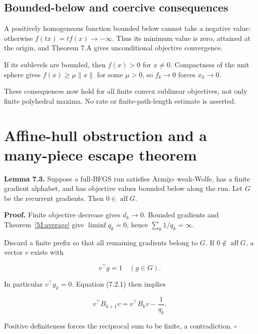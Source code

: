 

\subsection{Bounded-below and coercive
consequences}\label{H:bounded-below-and-coercive-consequences}


A positively homogeneous function bounded below cannot take a negative
value: otherwise \(f(tx)=tf(x)\to-\infty\). Thus its minimum value is
zero, attained at the origin, and Theorem 7.A gives unconditional
objective convergence.

If its sublevels are bounded, then \(f(x)>0\) for \(x\ne0\). Compactness
of the unit sphere gives \(f(x)\ge\mu\|x\|\) for some \(\mu>0\), so
\(f_k\to0\) forces \(x_k\to0\).

These consequences now hold for all finite convex sublinear objectives,
not only finite polyhedral maxima. No rate or finite-path-length
estimate is asserted.


\setcounter{section}{5}
\setcounter{theorem}{0}
\setcounter{lemma}{0}
\setcounter{corollary}{0}
\setcounter{proposition}{0}
\setcounter{remark}{0}
\setcounter{equation}{0}


\section{Affine-hull obstruction and a many-piece escape
theorem}\label{H:affine-hull-obstruction-and-a-many-piece-escape-theorem}

\textbf{Lemma 7.3.} Suppose a full-BFGS run satisfies Armijo--weak-Wolfe,
has a finite gradient alphabet, and has objective values bounded below
along the run. Let \(G\) be the recurrent gradients. Then
\(0\in\operatorname{aff}G\).

\textbf{Proof.} Finite objective decrease gives \(d_k\to0\). Bounded
gradients and Theorem~\ref{M:average} give \(\liminf q_k=0\), hence
\(\sum_k1/q_k=\infty\).

Discard a finite prefix so that all remaining gradients belong to \(G\).
If \(0\notin\operatorname{aff}G\), a vector \(v\) exists with

\[
v^\top g=1\quad(g\in G).
\]

In particular \(v^\top y_k=0\). Equation (7.2.1) then implies

\[
v^\top B_{k+1}v=v^\top B_kv-\frac1{q_k}.
\]

Positive definiteness forces the reciprocal sum to be finite, a
contradiction. \(\square\)

